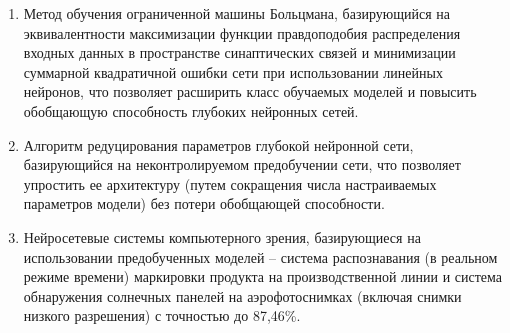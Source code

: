 \begin{enumerate}[wide, labelindent=10mm]
\item Метод обучения ограниченной машины Больцмана, базирующийся на эквивалентности максимизации функции правдоподобия распределения входных данных в пространстве синаптических связей и минимизации суммарной квадратичной ошибки сети при использовании линейных нейронов, что позволяет расширить класс обучаемых моделей и повысить обобщающую способность глубоких нейронных сетей.
\item Алгоритм редуцирования параметров глубокой нейронной сети, базирующийся на неконтролируемом предобучении сети, что позволяет упростить ее архитектуру (путем сокращения числа настраиваемых параметров модели) без потери обобщающей способности.
\item Нейросетевые системы компьютерного зрения, базирующиеся на использовании предобученных моделей -- система распознавания (в реальном режиме времени) маркировки продукта на производственной линии и система обнаружения солнечных панелей на аэрофотоснимках (включая снимки низкого разрешения) с точностью до 87,46\%.

\end{enumerate}

